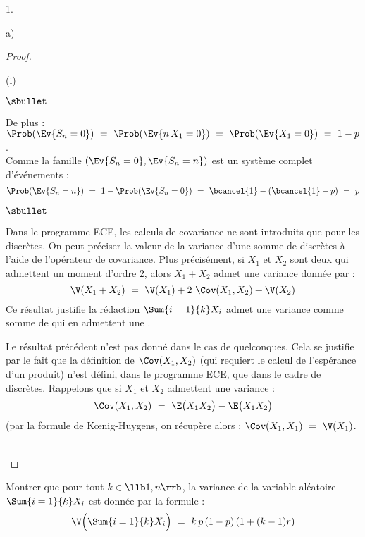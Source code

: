 \documentclass[11pt]{article}%
\begin{document}
\begin{noliste}{1.}
\begin{noliste}{a)}
\begin{proof}
\begin{nonoliste}{(i)}
\begin{noliste}{$\sbullet$}
	  \item De plus : $\Prob(\Ev{S_n=0}) \ = \ \Prob(\Ev{n \, X_1 
	  =0}) \ = \ \Prob(\Ev{X_1=0}) \ = \ 1-p$.\\
	  Comme la famille $(\Ev{S_n=0}, \Ev{S_n=n})$ est un système 
	  complet d'événements :
	  \[
	    \Prob(\Ev{S_n=n}) \ = \ 1-\Prob(\Ev{S_n=0}) \ = \
	    \bcancel{1}-(\bcancel{1}-p) \ = \ p
	  \]
        \end{noliste}
      \end{nonoliste}
      \begin{remarkL}{.98}%
        \begin{noliste}{$\sbullet$}
        \item Dans le programme ECE, les calculs de covariance ne sont
          introduits que pour les \var discrètes. On peut préciser la
          valeur de la variance d'une somme de \var discrètes à l'aide
          de l'opérateur de covariance. Plus précisément, si $X_1$ et
          $X_2$ sont deux \var {\bf discrètes} qui admettent un moment
          d'ordre $2$, alors $X_1 + X_2$ admet une variance donnée par
          :
          \[
          \V(X_1+ X_2) \ = \ \V(X_1) + 2 \ \Cov(X_1, X_2) + \V(X_2)
          \]
          Ce résultat justifie la rédaction \og $\Sum{i = 1}{k} X_i$
          admet une variance comme somme de \var {\bf discrètes} qui
          en admettent une \fg{}.
        \item Le résultat précédent n'est pas donné dans le cas de
          \var quelconques. Cela se justifie par le fait que la
          définition de $\Cov(X_1, X_2)$ (qui requiert le calcul de
          l'espérance d'un produit) n'est défini, dans le programme
          ECE, que dans le cadre de \var discrètes. Rappelons que si
          $X_1$ et $X_2$ admettent une variance :
          \[
          \Cov(X_1, X_2) \ = \ \E\big(X_1 X_2\big) - \E \big(X_1
          X_2\big)
          \]
          (par la formule de K\oe{}nig-Huygens, on récupère alors :
          $\Cov(X_1, X_1) \ = \ \V(X_1)$.
        \end{noliste}
      \end{remarkL}~\\[-1.4cm]
    \end{proof}


    \newpage

    
  \item Montrer que pour tout $k \in \llb 1,n \rrb$, la variance de la
    variable aléatoire $\Sum{i=1}{k} X_i$ est donnée par la formule :
    \[
    \V \Big(\Sum{i=1}{k} X_i\Big) \ = \ k \, p \, (1-p) \, (1+(k-1)r)
    \]
    

\end{noliste}
\end{noliste}
\end{document}
